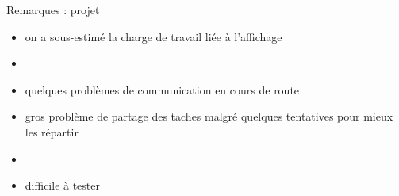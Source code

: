 \documentclass[11pt]{beamer}
\begin{document}
\begin{frame}{Remarques : projet}
	\begin{itemize}
		\item on a sous-estimé la charge de travail liée à l'affichage
		\item[]
		\item quelques problèmes de communication en cours de route
		\item gros problème de partage des taches malgré quelques tentatives pour mieux les répartir
		\item[]
		\item difficile à tester
	\end{itemize}
\end{frame}
\end{document}
